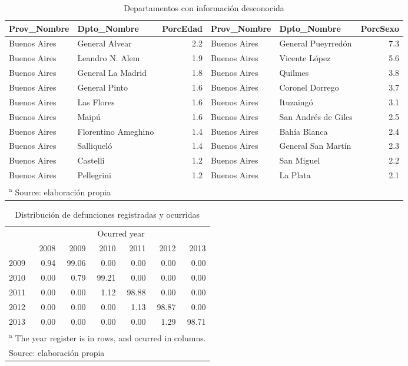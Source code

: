 \documentclass[12pt,]{article}
\begin{document}
\begin{table}

\caption{\label{tab:UnkSexAge}Departamentos con información desconocida}
\centering
\begin{tabular}[t]{l|l|r|l|l|r}
\hline
Prov\_Nombre & Dpto\_Nombre & PorcEdad & Prov\_Nombre & Dpto\_Nombre & PorcSexo\\
\hline
Buenos Aires & General Alvear & 2.2 & Buenos Aires & General Pueyrredón & 7.3\\
\hline
Buenos Aires & Leandro N. Alem & 1.9 & Buenos Aires & Vicente López & 5.6\\
\hline
Buenos Aires & General La Madrid & 1.8 & Buenos Aires & Quilmes & 3.8\\
\hline
Buenos Aires & General Pinto & 1.6 & Buenos Aires & Coronel Dorrego & 3.7\\
\hline
Buenos Aires & Las Flores & 1.6 & Buenos Aires & Ituzaingó & 3.1\\
\hline
Buenos Aires & Maipú & 1.6 & Buenos Aires & San Andrés de Giles & 2.5\\
\hline
Buenos Aires & Florentino Ameghino & 1.4 & Buenos Aires & Bahía Blanca & 2.4\\
\hline
Buenos Aires & Salliqueló & 1.4 & Buenos Aires & General San Martín & 2.3\\
\hline
Buenos Aires & Castelli & 1.2 & Buenos Aires & San Miguel & 2.2\\
\hline
Buenos Aires & Pellegrini & 1.2 & Buenos Aires & La Plata & 2.1\\
\hline
\multicolumn{6}{l}{\textsuperscript{a} Source: elaboración propia}\\
\end{tabular}
\end{table}

\begin{table}

\caption{\label{tab:def_tardias}Distribución de defunciones registradas y ocurridas}
\centering
\begin{tabular}[t]{l|r|r|r|r|r|r}
\hline
\multicolumn{1}{c|}{ } & \multicolumn{6}{c}{Ocurred year} \\
\cline{2-7}
  & 2008 & 2009 & 2010 & 2011 & 2012 & 2013\\
\hline
2009 & 0.94 & 99.06 & 0.00 & 0.00 & 0.00 & 0.00\\
\hline
2010 & 0.00 & 0.79 & 99.21 & 0.00 & 0.00 & 0.00\\
\hline
2011 & 0.00 & 0.00 & 1.12 & 98.88 & 0.00 & 0.00\\
\hline
2012 & 0.00 & 0.00 & 0.00 & 1.13 & 98.87 & 0.00\\
\hline
2013 & 0.00 & 0.00 & 0.00 & 0.00 & 1.29 & 98.71\\
\hline
\multicolumn{7}{l}{\textsuperscript{a} The year register is in rows, and ocurred in columns.}\\
\multicolumn{7}{l}{Source: elaboración propia}\\
\end{tabular}
\end{table}
\end{document}
